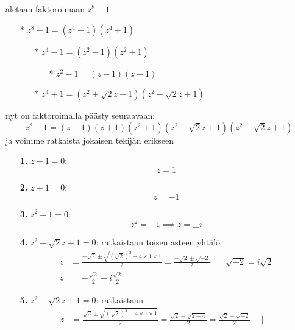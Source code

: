 \documentclass{article}
\begin{document}
\begin{itemize}
    \iffalse
    aletaan faktoroimaan $z^8 - 1$
    \begin{itemize}
        \item[*] $z^8 - 1 = (z^4 - 1)(z^4 + 1)$
        \begin{itemize}
            \item[*] $z^4 - 1 = (z^2 - 1)(z^2 + 1)$
            \begin{itemize}
                \item[*] $z^2 - 1 = (z - 1)(z + 1)$
            \end{itemize}
            \item[*] $z^4 + 1 = (z^2 + \sqrt{2}z + 1)(z^2 - \sqrt{2}z + 1)$
        \end{itemize}
    \end{itemize}
    nyt on faktoroimalla päästy seuraavaan:
    \[
    z^8 - 1 = (z - 1)(z + 1)(z^2 + 1)(z^2 + \sqrt{2}z + 1)(z^2 - \sqrt{2}z + 1)
    \]
    ja voimme ratkaista jokaisen tekijän erikseen
    \begin{itemize}
        \item [\textbf{1.}] $z - 1 = 0$:\newline
        \[
        z = 1
        \]
        \item [\textbf{2.}] $z + 1 = 0$:\newline
        \[
        z = -1
        \]
        \item [\textbf{3.}] $z^2 + 1 = 0$:
        \[
        z^2 = -1 \implies z = \pm i
        \]
        \item [\textbf{4.}] $z^2 + \sqrt{2}z + 1 = 0$:\newline
        ratkaistaan toisen asteen yhtälö
        \[
        \begin{aligned}
            z &= \frac{-\sqrt{2} \pm \sqrt{ (\sqrt{2})^2 - 4 \times 1 \times 1 }}{2} = \frac{-\sqrt{2} \pm \sqrt{-2}}{2}\quad \mid  \sqrt{-2} = i\sqrt{2}\\
            z &= -\frac{\sqrt{2}}{2} \pm i\frac{\sqrt{2}}{2}                
        \end{aligned}
        \]
        \item [\textbf{5.}] $z^2 - \sqrt{2}z + 1 = 0$:\newline
        ratkaistaan
        \[
            \begin{aligned}
                z &= \frac{\sqrt{2} \pm \sqrt{ (\sqrt{2})^2 - 4 \times 1 \times 1 }}{2} = \frac{\sqrt{2} \pm \sqrt{2 - 4}}{2} = \frac{\sqrt{2} \pm \sqrt{-2}}{2} \quad \mid
                \begin{aligned}

\end{aligned}
\end{aligned}\]
\end{itemize}
\end{itemize}
\end{document}
